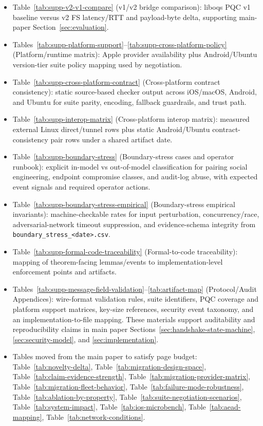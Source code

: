 \documentclass[10pt,journal,compsoc]{IEEEtran}
\begin{document}
\begin{itemize}
\item Table~\ref{tab:supp-v2-v1-compare} (v1/v2 bridge comparison): liboqs PQC v1 baseline versus v2 FS latency/RTT and payload-byte delta, supporting main-paper Section~\ref{sec:evaluation}.
\item Tables~\ref{tab:supp-platform-support}--\ref{tab:supp-cross-platform-policy} (Platform/runtime matrix): Apple provider availability plus Android/Ubuntu version-tier suite policy mapping used by negotiation.
\item Table~\ref{tab:supp-cross-platform-contract} (Cross-platform contract consistency): static source-based checker output across iOS/macOS, Android, and Ubuntu for suite parity, encoding, fallback guardrails, and trust path.
\item Table~\ref{tab:supp-interop-matrix} (Cross-platform interop matrix): measured external Linux direct/tunnel rows plus static Android/Ubuntu contract-consistency pair rows under a shared artifact date.
\item Table~\ref{tab:supp-boundary-stress} (Boundary-stress cases and operator runbook): explicit in-model vs out-of-model classification for pairing social engineering, endpoint compromise classes, and audit-log abuse, with expected event signals and required operator actions.
\item Table~\ref{tab:supp-boundary-stress-empirical} (Boundary-stress empirical invariants): machine-checkable rates for input perturbation, concurrency/race, adversarial-network timeout suppression, and evidence-schema integrity from \texttt{boundary\_stress\_<date>.csv}.
\item Table~\ref{tab:supp-formal-code-traceability} (Formal-to-code traceability): mapping of theorem-facing lemmas/events to implementation-level enforcement points and artifacts.
\item Tables~\ref{tab:supp-message-field-validation}--\ref{tab:artifact-map} (Protocol/Audit Appendices): wire-format validation rules, suite identifiers, PQC coverage and platform support matrices, key-size references, security event taxonomy, and an implementation-to-file mapping. These materials support auditability and reproducibility claims in main paper Sections~\ref{sec:handshake-state-machine}, \ref{sec:security-model}, and \ref{sec:implementation}.
\item Tables moved from the main paper to satisfy page budget: Table~\ref{tab:novelty-delta}, Table~\ref{tab:migration-design-space}, Table~\ref{tab:claim-evidence-strength}, Table~\ref{tab:migration-provider-matrix}, Table~\ref{tab:migration-fleet-behavior}, Table~\ref{tab:failure-mode-robustness}, Table~\ref{tab:ablation-by-property}, Table~\ref{tab:suite-negotiation-scenarios}, Table~\ref{tab:system-impact}, Table~\ref{tab:ios-microbench}, Table~\ref{tab:aead-mapping}, Table~\ref{tab:network-conditions}.
\end{itemize}
\end{document}
